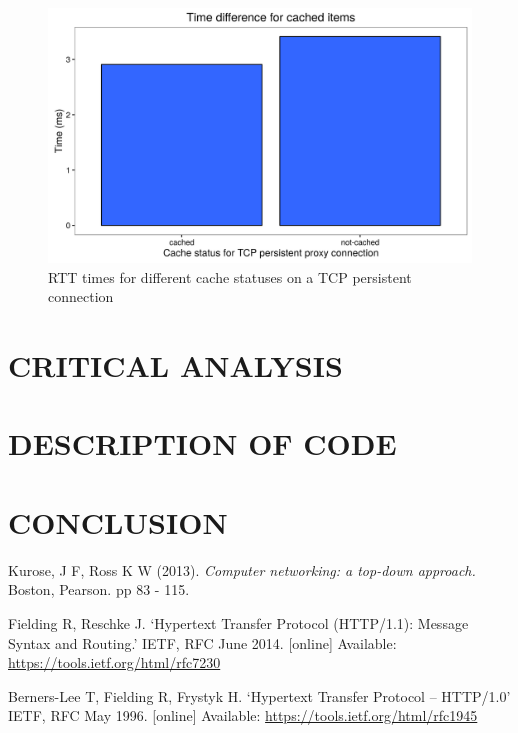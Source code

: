 \documentclass[10pt,twocolumn]{witseiepaper}
\begin{document}
		\begin{figure}
			\centering
			\includegraphics[width=\columnwidth]{resources/RTT_cache.png}
			\caption{RTT times for different cache statuses on a TCP persistent connection}
			\label{fig:rtt_cache}
		\end{figure}


\section{CRITICAL ANALYSIS}

\section{DESCRIPTION OF CODE}

%


\section{CONCLUSION}


\begin{thebibliography}{1}

 Kurose, J F, Ross K W (2013). \emph{Computer networking: a top-down approach.} Boston, Pearson. pp 83 - 115.

 Fielding R, Reschke J. `Hypertext Transfer Protocol (HTTP/1.1): Message Syntax and Routing.' IETF, RFC June 2014. [online] Available: \url{https://tools.ietf.org/html/rfc7230}

 Berners-Lee T, Fielding R, Frystyk H. `Hypertext Transfer Protocol -- HTTP/1.0' IETF, RFC May 1996. [online] Available: \url{https://tools.ietf.org/html/rfc1945}

\end{thebibliography}
\end{document}
